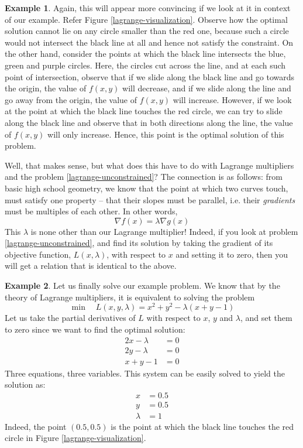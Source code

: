 \documentclass[a4paper]{article}
\theoremstyle{definition}
\newtheorem{example}{Example}[section]
\begin{document}
\begin{example}
	Again, this will appear more convincing if we look at it in context of our example.
	Refer Figure \ref{lagrange-visualization}.
	Observe how the optimal solution cannot lie on any circle smaller than the red one, because such a circle would not intersect the black line at all and hence not satisfy the constraint.
	On the other hand, consider the points at which the black line intersects the blue, green and purple circles.
	Here, the circles cut across the line, and at each such point of intersection, observe that if we slide along the black line and go towards the origin, the value of $f(x, y)$ will decrease, and if we slide along the line and go away from the origin, the value of $f(x, y)$ will increase.
	However, if we look at the point at which the black line touches the red circle, we can try to slide along the black line and observe that in both directions along the line, the value of $f(x, y)$ will only increase.
	Hence, this point is the optimal solution of this problem.
\end{example}

Well, that makes sense, but what does this have to do with Lagrange multipliers and the problem \eqref{lagrange-unconstrained}?
The connection is as follows: from basic high school geometry, we know that the point at which two curves touch, must satisfy one property -- that their slopes must be parallel, i.e. their \textit{gradients} must be multiples of each other.
In other words,
\begin{equation*}
	\nabla f(x) = \lambda \nabla g(x)
\end{equation*}
This $\lambda$ is none other than our Lagrange multiplier!
Indeed, if you look at problem \eqref{lagrange-unconstrained}, and find its solution by taking the gradient of its objective function, $L(x, \lambda)$, with respect to $x$ and setting it to zero, then you will get a relation that is identical to the above.

\begin{example}
	Let us finally solve our example problem.
	We know that by the theory of Lagrange multipliers, it is equivalent to solving the problem
	\begin{equation*}
		\min \quad L(x, y, \lambda) = x^2 + y^2 - \lambda(x + y - 1)
	\end{equation*}
	Let us take the partial derivatives of $L$ with respect to $x$, $y$ and $\lambda$, and set them to zero since we want to find the optimal solution:
	\begin{align*}
		2x - \lambda & = 0 \\
		2y - \lambda & = 0 \\
		x + y - 1 & = 0
	\end{align*}
	Three equations, three variables.
	This system can be easily solved to yield the solution as:
	\begin{align*}
		x & = 0.5 \\
		y & = 0.5 \\
		\lambda & = 1
	\end{align*}
	Indeed, the point $(0.5, 0.5)$ is the point at which the black line touches the red circle in Figure \ref{lagrange-visualization}.
\end{example}
\end{document}
